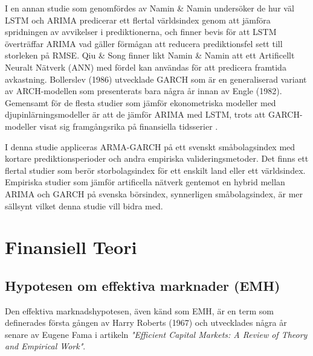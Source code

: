 \documentclass[11pt]{article}
\numberwithin{equation}{section}
\numberwithin{table}{section}
\numberwithin{figure}{section}
\begin{document}
I en annan studie som genomfördes av Namin \& Namin \parencite*{siaminamini2018forecasting} undersöker de hur väl LSTM och ARIMA predicerar ett flertal världsindex genom att jämföra spridningen av avvikelser i prediktionerna, och finner bevis för att LSTM överträffar ARIMA vad gäller förmågan att reducera prediktionsfel sett till storleken på RMSE. Qiu \& Song \parencite*{10.1371/journal.pone.0155133} finner likt Namin \& Namin \parencite*{siaminamini2018forecasting} att ett Artificellt Neuralt Nätverk (ANN) med fördel kan användas för att predicera framtida avkastning. Bollerslev (1986) utvecklade GARCH som är en generaliserad variant av ARCH-modellen som presenterats bara några år innan av Engle (1982). Gemensamt för de flesta studier som jämför ekonometriska modeller med djupinlärningsmodeller är att de jämför ARIMA med LSTM, trots att GARCH-modeller visat sig framgångsrika på finansiella tidsserier \parencite{garch}.

I denna studie appliceras ARMA-GARCH på ett svenskt småbolagsindex med kortare prediktionsperioder och andra empiriska valideringsmetoder. Det finns ett flertal studier som berör storbolagsindex för ett enskilt land eller ett världsindex. Empiriska studier som jämför artificella nätverk gentemot en hybrid mellan ARIMA och GARCH på svenska börsindex, synnerligen småbolagsindex, är mer sällsynt vilket denna studie vill bidra med. 






 

\newpage
\section{Finansiell Teori}

\subsection{Hypotesen om effektiva marknader (EMH)}
Den effektiva marknadshypotesen, även känd som EMH, är en term som definerades första gången av Harry Roberts (1967) och utvecklades några år senare av Eugene Fama \parencite*{Fama1970} i artikeln \emph{"Efficient Capital Markets: A Review of Theory and Empirical Work"}. 
\end{document}
